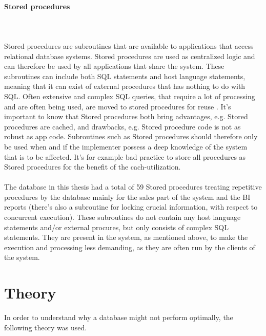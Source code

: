 \documentclass{cslthse-msc}
\begin{document}
\paragraph*{Stored procedures}\mbox{}\\\\ 
Stored procedures are subroutines that are available to applications that access relational database systems. Stored procedures are used as centralized logic and can therefore be used by all applications that share the system. These subroutines can include both SQL statements and host language statements, meaning that it can exist of external procedures that has nothing to do with SQL. Often extensive and complex SQL queries, that require a lot of processing and are often being used, are moved to stored procedures for reuse \cite{StoredProcedures}. It's important to know that Stored procedures both bring advantages, e.g. Stored procedures are cached, and drawbacks, e.g. Stored procedure code is not as robust as app code. Subroutines such as Stored procedures should therefore only be used when and if the implementer possess a deep knowledge of the system that is to be affected. It's for example bad practice to store all procedures as Stored procedures for the benefit of the cach-utilization.\\\\
The database in this thesis had a total of 59 Stored procedures treating repetitive procedures by the database mainly for the sales part of the system and the BI reports (there's also a subroutine for locking crucial information, with respect to concurrent execution). These subroutines do not contain any host language statements and/or external procures, but only consists of complex SQL statements. They are present in the system, as mentioned above, to make the execution and processing less demanding, as they are often run by the clients of the system.
 
\section{Theory}
In order to understand why a database might not perform optimally, the following theory was used.
\end{document}
